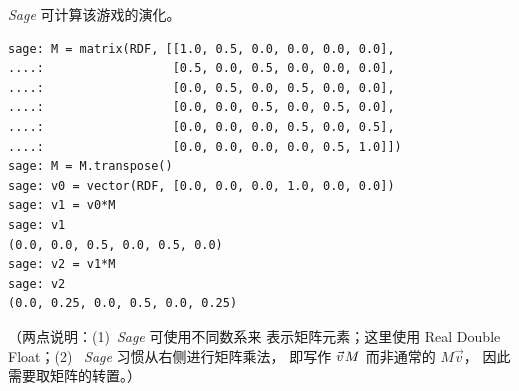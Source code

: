 \textit{Sage} 可计算该游戏的演化。 
\begin{lstlisting}
sage: M = matrix(RDF, [[1.0, 0.5, 0.0, 0.0, 0.0, 0.0],
....:                  [0.5, 0.0, 0.5, 0.0, 0.0, 0.0],
....:                  [0.0, 0.5, 0.0, 0.5, 0.0, 0.0],
....:                  [0.0, 0.0, 0.5, 0.0, 0.5, 0.0],
....:                  [0.0, 0.0, 0.0, 0.5, 0.0, 0.5],
....:                  [0.0, 0.0, 0.0, 0.0, 0.5, 1.0]])
sage: M = M.transpose()
sage: v0 = vector(RDF, [0.0, 0.0, 0.0, 1.0, 0.0, 0.0])
sage: v1 = v0*M
sage: v1
(0.0, 0.0, 0.5, 0.0, 0.5, 0.0)
sage: v2 = v1*M
sage: v2
(0.0, 0.25, 0.0, 0.5, 0.0, 0.25)  
\end{lstlisting}
（两点说明：(1)~\textit{Sage} 可使用不同数系来
表示矩阵元素；这里使用 Real Double Float；(2)~
\textit{Sage} 习惯从右侧进行矩阵乘法，
即写作 $\vec{v}\hspace{.1em}M$ 而非通常的 $M\vec{v}$，
因此需要取矩阵的转置。）

